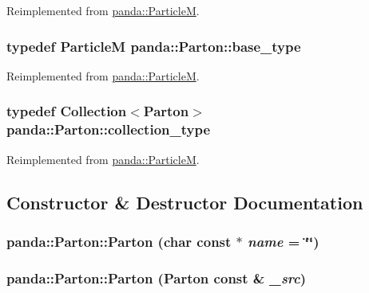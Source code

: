 Reimplemented from \hyperlink{classpanda_1_1ParticleM_a1ba36e35f5cd6a26decfbaa815678d2a}{panda::ParticleM}.\hypertarget{classpanda_1_1Parton_a4a5dd86c3661af38dced3271214551c4}{
\subsubsection[{base\_\-type}]{\setlength{\rightskip}{0pt plus 5cm}typedef {\bf ParticleM} {\bf panda::Parton::base\_\-type}}}
\label{classpanda_1_1Parton_a4a5dd86c3661af38dced3271214551c4}


Reimplemented from \hyperlink{classpanda_1_1ParticleM_a134d640b78531bc47ddb19ba490de07d}{panda::ParticleM}.\hypertarget{classpanda_1_1Parton_adced932b94de43884831c4685e542518}{
\subsubsection[{collection\_\-type}]{\setlength{\rightskip}{0pt plus 5cm}typedef {\bf Collection}$<${\bf Parton}$>$ {\bf panda::Parton::collection\_\-type}}}
\label{classpanda_1_1Parton_adced932b94de43884831c4685e542518}


Reimplemented from \hyperlink{classpanda_1_1ParticleM_ae39fbe234c21960d067e8790541d0d68}{panda::ParticleM}.

\subsection{Constructor \& Destructor Documentation}
\hypertarget{classpanda_1_1Parton_a35d82b5fdf37ff12e17c2491dbd188b5}{
\subsubsection[{Parton}]{\setlength{\rightskip}{0pt plus 5cm}panda::Parton::Parton (char const $\ast$ {\em name} = {\ttfamily \char`\"{}\char`\"{}})}}
\label{classpanda_1_1Parton_a35d82b5fdf37ff12e17c2491dbd188b5}
\hypertarget{classpanda_1_1Parton_a95d82e4fc54a04ec13ae894134c834d5}{
\subsubsection[{Parton}]{\setlength{\rightskip}{0pt plus 5cm}panda::Parton::Parton ({\bf Parton} const \& {\em \_\-src})}}
\label{classpanda_1_1Parton_a95d82e4fc54a04ec13ae894134c834d5}


